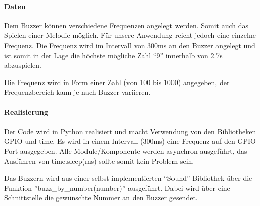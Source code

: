 \documentclass[../../main.tex]{subfiles}
\begin{document}
\paragraph{Daten}
Dem Buzzer können verschiedene Frequenzen angelegt werden. Somit auch das Spielen einer Melodie möglich. Für unsere Anwendung reicht jedoch eine einzelne Frequenz. Die Frequenz wird im Intervall von 300ms an den Buzzer angelegt und ist somit in der Lage die höchste mögliche Zahl ``9'' innerhalb von 2.7s abzuspielen.

Die Frequenz wird in Form einer Zahl (von 100 bis 1000) angegeben, der Frequenzbereich kann je nach Buzzer variieren.

\paragraph{Realisierung}
Der Code wird in Python realisiert und macht Verwendung von den Bibliotheken GPIO und time. Es wird in einem Intervall (300ms) eine Frequenz auf den GPIO Port ausgegeben. Alle Module/Komponente werden asynchron ausgeführt, das Ausführen von time.sleep(ms) sollte somit kein Problem sein.

Das Buzzern wird aus einer selbst implementierten ``Sound''-Bibliothek über die Funktion ''buzz\_by\_number(number)'' ausgeführt. Dabei wird über eine Schnittstelle die gewünschte Nummer an den Buzzer gesendet.
\end{document}
